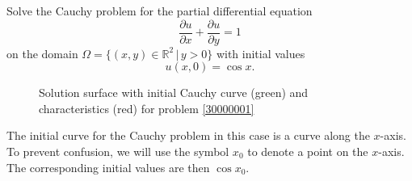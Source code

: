 Solve the Cauchy problem for the partial differential equation
\[
\frac{\partial u}{\partial x}
+
\frac{\partial u}{\partial y}
=1
\]
on the domain
$\Omega = \{ (x,y)\in\mathbb R^2\,|\, y > 0\}$
with initial values
\[
u(x,0)=\cos x.
\]

\begin{loesung}
\begin{figure}
\centering
{}
\caption{Solution surface with initial Cauchy curve (green) and
characteristics (red) for problem \ref{30000001}
\label{30000001:solutionfigure}}
\end{figure}
The initial curve for the Cauchy problem in this case is a curve
along the $x$-axis.
To prevent confusion, we will use the symbol $x_0$ to denote a point
on the $x$-axis. 
The corresponding initial values are then $\cos x_0$.


\end{loesung}
